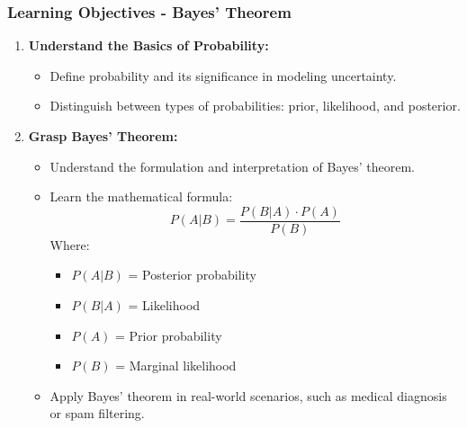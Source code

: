 \documentclass[aspectratio=169]{beamer}
\begin{document}
\begin{frame}[fragile]
    \frametitle{Learning Objectives - Bayes' Theorem}
    \begin{enumerate}
        \item \textbf{Understand the Basics of Probability:}
        \begin{itemize}
            \item Define probability and its significance in modeling uncertainty.
            \item Distinguish between types of probabilities: prior, likelihood, and posterior.
        \end{itemize}

        \item \textbf{Grasp Bayes' Theorem:}
        \begin{itemize}
            \item Understand the formulation and interpretation of Bayes' theorem.
            \item Learn the mathematical formula:
            \begin{equation}
            P(A|B) = \frac{P(B|A) \cdot P(A)}{P(B)}
            \end{equation}
            Where:
            \begin{itemize}
                \item $P(A|B)$ = Posterior probability
                \item $P(B|A)$ = Likelihood
                \item $P(A)$ = Prior probability
                \item $P(B)$ = Marginal likelihood
            \end{itemize}
            \item Apply Bayes' theorem in real-world scenarios, such as medical diagnosis or spam filtering.
        \end{itemize}
    \end{enumerate}
\end{frame}
\end{document}
